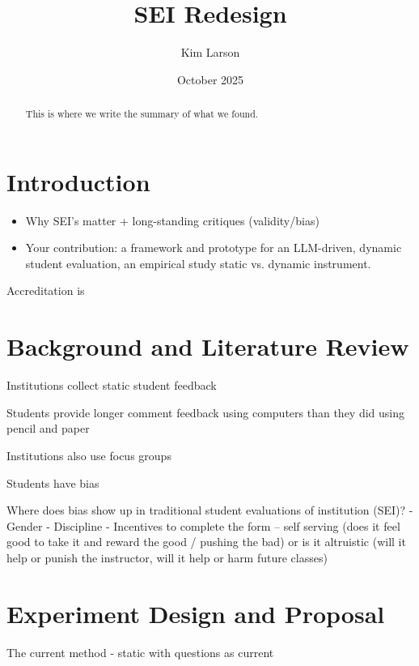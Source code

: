 \documentclass[11pt]{article}
\title{SEI Redesign}
\author{Kim Larson}
\date{October 2025}
\begin{document}
\maketitle

\begin{abstract}
This is where we write the summary of what we found. \cite{kennedy2018evaluation}


\end{abstract}



\section{Introduction}


\begin{itemize}
    \item Why SEI's matter + long-standing critiques (validity/bias)
    
    \item Your contribution: a framework and prototype for an LLM-driven, dynamic student evaluation, an empirical study static vs. dynamic instrument.
\end{itemize}



Accreditation is 

\section{Background and Literature Review}


Institutions collect static student feedback \cite{ALHIJA200937}

Students provide longer comment feedback using computers than they did using pencil and paper \cite{}

Institutions also use focus groups\cite{Smithson01012000}

Students have bias \cite{stoesz2022bias}

Where does bias show up in traditional student evaluations of institution (SEI)? 
- Gender
- Discipline 
- Incentives to complete the form -- self serving (does it feel good to take it and reward the good / pushing the bad) or is it altruistic (will it help or punish the instructor, will it help or harm future classes) \cite{Hamilton01072002}





\section{Experiment Design and Proposal}
The current method - static with questions as current 
\end{document}
